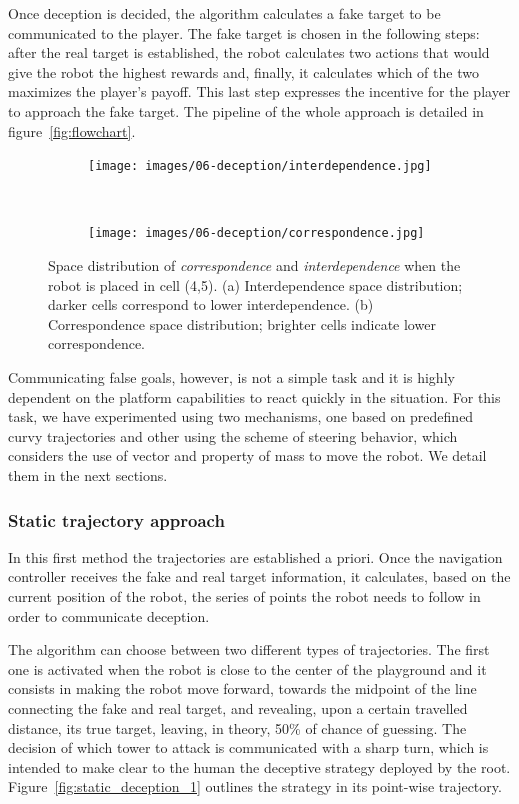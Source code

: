 Once deception is decided, the algorithm calculates a fake target to be communicated to the player. The fake target is chosen in the following steps: after the real target is established, the robot calculates two actions that would give the robot the highest rewards and, finally, it calculates which of the two maximizes the player's payoff. This last step expresses the incentive for the player to approach the fake target. The pipeline of the whole approach is detailed in figure~\ref{fig:flowchart}.

\begin{figure}[H]
    \centering
    \begin{subfigure}[t]{0.49\columnwidth}
        \centering
        \texttt{[image: images/06-deception/interdependence.jpg]}
        \caption{}
        \label{fig:interdipendence}
    \end{subfigure}
    ~
    \begin{subfigure}[t]{0.49\columnwidth}
        \centering
        \texttt{[image: images/06-deception/correspondence.jpg]}
        \caption{}
        \label{fig:correspondence}
    \end{subfigure}
    \caption{Space distribution of \textit{correspondence} and \textit{interdependence} when the robot is placed in cell (4,5). (a) Interdependence space distribution; darker cells correspond to lower interdependence. (b) Correspondence space distribution; brighter cells indicate lower correspondence.}
    \label{fig::interdependece}
\end{figure}

Communicating false goals, however, is not a simple task and it is highly dependent on the platform capabilities to react quickly in the situation. For this task, we have experimented using two mechanisms, one based on predefined curvy trajectories and other using the scheme of steering behavior, which considers the use of vector and property of mass to move the robot. We detail them in the next sections.

\subsubsection{Static trajectory approach}
In this first method the trajectories are established a priori. Once the navigation controller receives the fake and real target information, it calculates, based on the current position of the robot, the series of points the robot needs to follow in order to communicate deception.

The algorithm can choose between two different types of trajectories. The first one is activated when the robot is close to the center of the playground and it consists in making the robot move forward, towards the midpoint of the line connecting the fake and real target, and revealing, upon a certain travelled distance, its true target, leaving, in theory, 50\% of chance of guessing. The decision of which tower to attack is communicated with a sharp turn, which is intended to make clear to the human the deceptive strategy deployed by the root. Figure~\ref{fig:static_deception_1} outlines the strategy in its point-wise trajectory.

